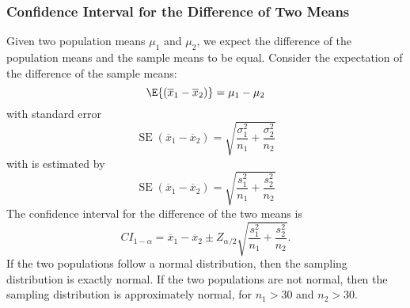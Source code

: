\documentclass{article}
\begin{document}
\subsubsection{Confidence Interval for the Difference of Two Means}
Given two population means \(\mu_1\) and \(\mu_2\), we expect the difference of the population means
and the sample means to be equal. Consider the expectation of the difference of the sample means:
\begin{equation*}
    \E{\left( \overline{x}_1 - \overline{x}_2 \right)} = \mu_1 - \mu_2
\end{equation*}
with standard error
\begin{equation*}
    \operatorname{SE}\left( \overline{x}_1 - \overline{x}_2 \right) = \sqrt{\frac{\sigma_1^2}{n_1} + \frac{\sigma_2^2}{n_2}}
\end{equation*}
with is estimated by
\begin{equation*}
    \operatorname{SE}\left( \overline{x}_1 - \overline{x}_2 \right) = \sqrt{\frac{s_1^2}{n_1} + \frac{s_2^2}{n_2}}
\end{equation*}
The confidence interval for the difference of the two means is
\begin{equation*}
    {CI}_{1-\alpha} = \overline{x}_1 - \overline{x}_2 \pm Z_{\alpha/2} \sqrt{\frac{s_1^2}{n_1} + \frac{s_2^2}{n_2}}.
\end{equation*}
If the two populations follow a normal distribution, then the sampling distribution is exactly normal.
If the two populations are not normal, then the sampling distribution is approximately normal, for \(n_1 > 30\) and \(n_2 > 30\).
\end{document}
